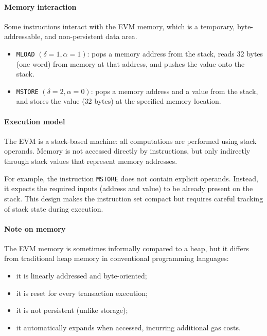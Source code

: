 \documentclass{scrbook}
\begin{document}
\paragraph{Memory interaction}
Some instructions interact with the EVM memory, which is a temporary, byte-addressable, and non-persistent data area.

\begin{itemize}
    \item \texttt{MLOAD} $(\delta = 1, \alpha = 1)$: pops a memory address from the stack, reads 32 bytes (one word) from memory at that address, and pushes the value onto the stack.
    
    \item \texttt{MSTORE} $(\delta = 2, \alpha = 0)$: pops a memory address and a value from the stack, and stores the value (32 bytes) at the specified memory location.
\end{itemize}

\paragraph{Execution model}
The EVM is a stack-based machine: all computations are performed using stack operands. Memory is not accessed directly by instructions, but only indirectly through stack values that represent memory addresses.

For example, the instruction \texttt{MSTORE} does not contain explicit operands. Instead, it expects the required inputs (address and value) to be already present on the stack. This design makes the instruction set compact but requires careful tracking of stack state during execution.

\paragraph{Note on memory}
The EVM memory is sometimes informally compared to a heap, but it differs from traditional heap memory in conventional programming languages:

\begin{itemize}
    \item it is linearly addressed and byte-oriented;
    \item it is reset for every transaction execution;
    \item it is not persistent (unlike storage);
    \item it automatically expands when accessed, incurring additional gas costs.
\end{itemize}
\end{document}
